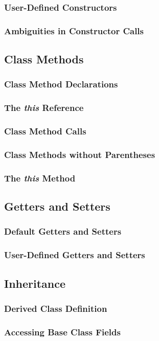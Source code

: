 \documentclass[10pt,twoside,titlepage]{article}
\begin{document}
\subsubsection{User-Defined Constructors}
\subsubsection{Ambiguities in Constructor Calls}
\subsection{Class Methods}
\subsubsection{Class Method Declarations}
\subsubsection{The {\em this} Reference}
\subsubsection{Class Method Calls}
\subsubsection{Class Methods without Parentheses}
\subsubsection{The {\em this} Method}
\subsection{Getters and Setters}
\subsubsection{Default Getters and Setters}
\subsubsection{User-Defined Getters and Setters}
\subsection{Inheritance}
\subsubsection{Derived Class Definition}
\subsubsection{Accessing Base Class Fields}
\end{document}

